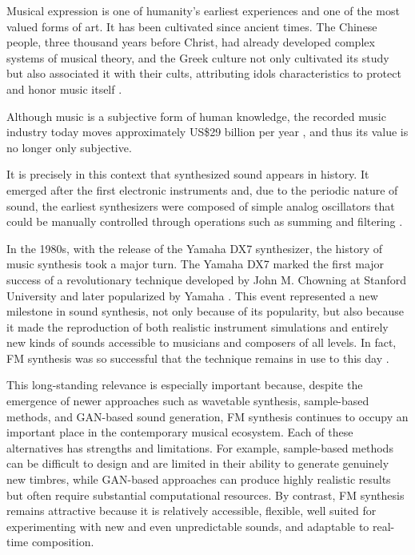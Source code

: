 \newcommand{\comando}[1]{\textbf{$\backslash$#1}}

Musical expression is one of humanity’s earliest experiences and one of the most valued forms of art. It has been cultivated since ancient times. The Chinese people, three thousand years before Christ, had already developed complex systems of musical theory, and the Greek culture not only cultivated its study but also associated it with their cults, attributing idols characteristics to protect and honor music itself \textcite{med1996teoria}.

Although music is a subjective form of human knowledge, the recorded music industry today moves approximately US\$29 billion per year \textcite{ifpi2025}, and thus its value is no longer only subjective.

It is precisely in this context that synthesized sound appears in history. It emerged after the first electronic instruments and, due to the periodic nature of sound, the earliest synthesizers were composed of simple analog oscillators that could be manually controlled through operations such as summing and filtering \textcite{holmes2016electronic}.

In the 1980s, with the release of the Yamaha DX7 synthesizer, the history of music synthesis took a major turn. The Yamaha DX7 marked the first major success of a revolutionary technique developed by John M. Chowning at Stanford University and later popularized by Yamaha \textcite{claesson2021resynthesis}. This event represented a new milestone in sound synthesis, not only because of its popularity, but also because it made the reproduction of both realistic instrument simulations and entirely new kinds of sounds accessible to musicians and composers of all levels. In fact, FM synthesis was so successful that the technique remains in use to this day \textcite{holmes2016electronic}.

This long-standing relevance is especially important because, despite the emergence of newer approaches such as wavetable synthesis, sample-based methods, and GAN-based sound generation, FM synthesis continues to occupy an important place in the contemporary musical ecosystem. Each of these alternatives has strengths and limitations. For example, sample-based methods can be difficult to design and are limited in their ability to generate genuinely new timbres, while GAN-based approaches can produce highly realistic results but often require substantial computational resources. By contrast, FM synthesis remains attractive because it is relatively accessible, flexible, well suited for experimenting with new and even unpredictable sounds, and adaptable to real-time composition.


